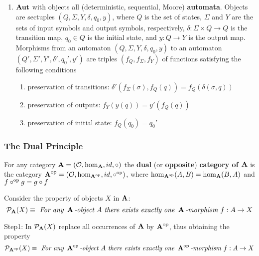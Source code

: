 \documentclass[11pt]{article}
\begin{document}
\begin{examplle}[]
\begin{enumerate}
\begin{enumerate}
\item \(\operatorname{\textbf{Aut}}\) with objects all (deterministic, sequential, Moore) \textbf{automata}.
Objects are sectuples \((Q,\Sigma,Y,\delta,q_0,y)\), where \(Q\) is the set of
states, \(\Sigma\) and \(Y\) are the sets of input symbols and output symbols,
respectively, \(\delta:\Sigma\times Q\to Q\) is the transition map, 
\(q_0\in Q\) is the initial state, and \(y:Q\to Y\) is the output map.
Morphisms from an automaton \((Q,\Sigma,Y,\delta,q_0,y)\) to an automaton
\((Q',\Sigma',Y',\delta',q_0',y')\) are triples \((f_Q,f_{\Sigma},f_Y)\) of
functions satisfying the following conditions
\begin{enumerate}
\item preservation of transitions:
\(\delta'(f_{\Sigma}(\sigma),f_Q(q))=f_Q(\delta(\sigma,q))\)

\item preservation of outputs: \(f_Y(y(q))=y'(f_Q(q))\)

\item preservation of initial state: \(f_Q(q_0)=q_0'\)
\end{enumerate}
\end{enumerate}
\end{enumerate}
\end{examplle}
\subsubsection{The Dual Principle}
\label{sec:orgd156492}
\begin{definition}[]
For any category \(\operatorname{\textbf{A}}=(\mathcal{O},\operatorname{hom}_{\operatorname{\textbf{A}}},id,\circ)\) the \textbf{dual} (or \textbf{opposite})
\textbf{category of \(\operatorname{\textbf{A}}\)} is the category
\(\operatorname{\textbf{A}}^{\operatorname{op}}=(\mathcal{O},\operatorname{hom}_{\operatorname{\textbf{A}}^{\operatorname{op}}},id,\circ^{\operatorname{op}})\), where
\(\operatorname{hom}_{\operatorname{\textbf{A}}^{\operatorname{op}}}(A,B)=\operatorname{hom}_{\operatorname{\textbf{A}}}(B,A)\) and \(f\circ^{\operatorname{op}}g=g\circ f\)
\end{definition}

Consider the property of objects \(X\) in \(\operatorname{\textbf{A}}\):
\begin{equation*}
\mathcal{P}_{\operatorname{\textbf{A}}}(X)\equiv \textit{ For any } \operatorname{\textbf{A}}\textit{-object } A
\textit{ there exists exactly one }
\operatorname{\textbf{A}}\textit{-morphism } f:A\to X
\end{equation*}

Step1: In \(\mathcal{P}_{\operatorname{\textbf{A}}}(X)\) replace all occurrences of \(\operatorname{\textbf{A}}\) by \(\operatorname{\textbf{A}}^{\operatorname{op}}\),
thus obtaining the property
\begin{equation*}
\mathcal{P}_{\operatorname{\textbf{A}}^{\operatorname{op}}}(X)\equiv \textit{ For any } \operatorname{\textbf{A}}^{\operatorname{op}}\textit{-object } A
\textit{ there exists exactly one }
\operatorname{\textbf{A}}^{\operatorname{op}}\textit{-morphism } f:A\to X
\end{equation*}
\end{document}
